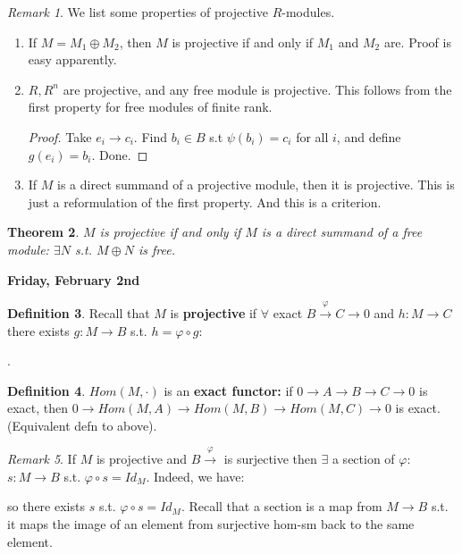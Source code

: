 \documentclass[12pt]{amsbook}
\theoremstyle{plain}
\newtheorem{theorem}{Theorem}[chapter]
\numberwithin{section}{chapter}
\numberwithin{equation}{chapter}
\theoremstyle{definition}
\newtheorem{Def}[theorem]{Definition}
\theoremstyle{remark}
\newtheorem{rem}[theorem]{Remark}
\renewcommand{\phi}{\varphi}
\begin{document}
\begin{rem}
We list some properties of projective $R$-modules. 

\begin{enumerate}
\item If $M = M_1 \oplus M_2$, then $M$ is projective if and only if $M_1$ and $M_2$ are. Proof is easy apparently. 

\item $R,R^n$ are projective, and any free module is projective. This follows from the first property for free modules of finite rank. 
\begin{proof}
Take $e_i \to c_i$. Find $b_i \in B$ s.t $\psi(b_i) = c_i$ for all $i$, and define $g(e_i) = b_i$. Done. 
\end{proof}

\item If $M$ is a direct summand of a projective module, then it is projective. This is just a reformulation of the first property. And this is a criterion. 
\end{enumerate}
\end{rem}

\begin{theorem}
$M$ is projective if and only if $M$ is a direct summand of a free module: $ \exists N$ s.t. $M \oplus N$ is free. 
\end{theorem}

\textbf{Friday, February 2nd}

\begin{Def}
Recall that $M$ is \textbf{projective} if $\forall$ exact $B \overset{\phi}{\to} C \to 0$ and $h:M \to C$ there exists $g:M \to B$ s.t. $h = \phi \circ g$:
\begin{center}
. 
\end{center}
\end{Def}

\begin{Def}
$Hom(M,\cdot)$ is an \textbf{exact functor:} if $0 \to A \to B \to C \to 0$ is exact, then $0 \to Hom(M,A) \to Hom(M,B) \to Hom(M,C) \to 0$ is exact. (Equivalent defn to above). 
\end{Def}


\begin{rem}
If $M$ is projective and $B \overset{\phi}{\to} $ is surjective then $\exists$ a section of $\phi:$ $s:M \to B$ s.t. $\phi \circ s = Id_M$. Indeed, we have: 
\begin{center}
\end{center}
so there exists $s$ s.t. $\phi\circ s = Id_M$. Recall that a section is a map from $M \to B$ s.t. it maps the image of an element from surjective hom-sm back to the same element. 
\end{rem}
\end{document}
